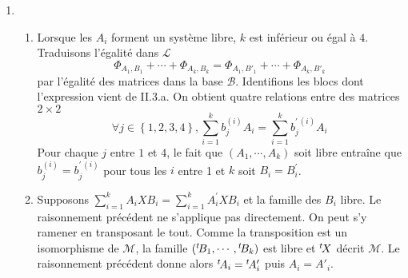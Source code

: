 \begin{enumerate}
\item
\begin{enumerate}
 \item Lorsque les $A_{i}$ forment un syst\`{e}me libre, $k$ est inf\'{e}rieur ou \'{e}gal \`{a} $4$. Traduisons l'égalité dans $\mathcal{L}$
\begin{displaymath}
 \Phi _{A_{1},B_{1}}+\cdots+\Phi _{A_{k},B_{k}} = \Phi _{A_{1},B'_{1}}+\cdots+\Phi _{A_{k},B'_{k}} 
\end{displaymath}
par l'égalité des matrices dans la base $\mathcal B$. Identifions les blocs dont l'expression vient
de II.3.a. On obtient quatre relations entre des matrices $2\times2$ 
\begin{displaymath}
\forall j\in \left\{ 1,2,3,4\right\}
,\sum_{i=1}^{k}b_{j}^{(i)}A_{i}=\sum_{i=1}^{k}b_{j}^{\prime \,(i)}A_{i} 
\end{displaymath}
Pour chaque $j$ entre $1$ et $4$, le fait que $(A_{1},\cdots,A_{k})$ soit libre entra\^{i}ne que $b_{j}^{(i)}=b_{j}^{\prime \,(i)}$ pour
tous les $i$ entre 1 et $k$ soit $B_{i}=B_{i}^{\prime }$.

 \item Supposons $\sum_{i=1}^{k}A_{i}XB_{i}=\sum_{i=1}^{k}A_{i}^{\prime }XB_{i}$ et la famille des $B_{i}$ libre. Le raisonnement pr\'{e}c\'{e}dent ne s'applique pas directement.\newline
On peut s'y ramener en transposant le tout. Comme la transposition est un isomorphisme de $\mathcal{M}$, la famille $(\mathstrut^t\!B_{1},\cdots ,\mathstrut^t\!B_{k})$ est libre et $\mathstrut^t\!X$ d\'{e}crit $\mathcal{M}$. Le raisonnement pr\'{e}c\'{e}dent donne alors $\mathstrut^t\!A_{i}= \mathstrut^t\!A'_{i}$ puis $A_{i}=A'_{i}$. 
\end{enumerate}

\end{enumerate}

